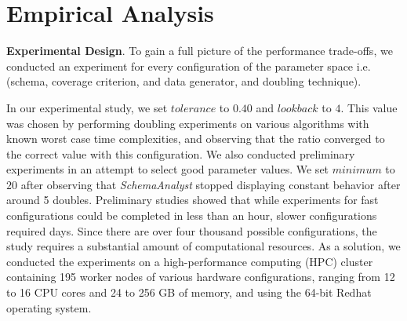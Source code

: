 
\section{Empirical Analysis}

\textbf{Experimental Design}. To gain a full picture of the performance trade-offs, we conducted an experiment for every configuration
of the parameter space i.e. (schema, coverage criterion, and data generator, and doubling technique). 

In our experimental study, we set $\mathit{tolerance}$ to $0.40$ and $\mathit{lookback}$ to $4$. This value was chosen
by performing doubling experiments on various algorithms with known worst case time complexities, and observing that the
ratio converged to the correct value with this configuration.  We also conducted preliminary experiments in an attempt
to select good parameter values. We set $\mathit{minimum}$ to $20$ after observing that \textit{SchemaAnalyst} stopped
displaying constant behavior after around 5 doubles.  Preliminary studies showed that while experiments for fast
configurations could be completed in less than an hour, slower configurations required days.  Since there are over four
thousand possible configurations, the study requires a substantial amount of computational resources.  As a solution, we
conducted the experiments on a high-performance computing (HPC) cluster containing 195 worker nodes of various hardware
configurations, ranging from 12 to 16 CPU cores and 24 to 256 GB of memory, and using the 64-bit Redhat operating
system.
